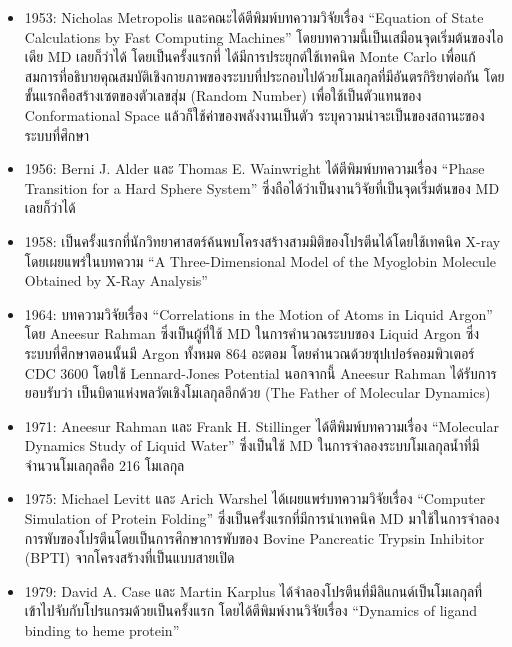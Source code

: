 \begin{itemize}
    \item 1953: Nicholas Metropolis และคณะได้ตีพิมพ์บทความวิจัยเรื่อง \enquote{Equation of State Calculations by Fast 
    Computing Machines}\autocite{metropolis1953} โดยบทความนี้เป็นเสมือนจุดเริ่มต้นของไอเดีย MD เลยก็ว่าได้ โดยเป็นครั้งแรกที่%
    ได้มีการประยุกต์ใช้เทคนิค Monte Carlo เพื่อแก้สมการที่อธิบายคุณสมบัติเชิงกายภาพของระบบที่ประกอบไปด้วยโมเลกุลที่มีอันตรกิริยาต่อกัน 
    โดยขั้นแรกคือสร้างเซตของตัวเลขสุ่ม (Random Number) เพื่อใช้เป็นตัวแทนของ Conformational Space แล้วก็ใช้ค่าของพลังงานเป็นตัว%
    ระบุความน่าจะเป็นของสถานะของระบบที่ศึกษา
    
    \item 1956: Berni J. Alder และ Thomas E. Wainwright ได้ตีพิมพ์บทความเรื่อง \enquote{Phase Transition for a Hard 
    Sphere System}\autocite{alder1957} ซึ่งถือได้ว่าเป็นงานวิจัยที่เป็นจุดเริ่มต้นของ MD เลยก็ว่าได้
    
    \item 1958: เป็นครั้งแรกที่นักวิทยาศาสตร์ค้นพบโครงสร้างสามมิติของโปรตีนได้โดยใช้เทคนิค X-ray โดยเผยแพร่ในบทความ 
    \enquote{A Three-Dimensional Model of the Myoglobin Molecule Obtained by X-Ray Analysis}\autocite{kendrew1958}

    \item 1964: บทความวิจัยเรื่อง \enquote{Correlations in the Motion of Atoms in Liquid Argon}\autocite{rahman1964} 
    โดย Aneesur Rahman ซึ่งเป็นผู้ที่ใช้ MD ในการคำนวณระบบของ Liquid Argon ซึ่งระบบที่ศึกษาตอนนั้นมี Argon ทั้งหมด 864 อะตอม 
    โดยคำนวณด้วยซุปเปอร์คอมพิวเตอร์  CDC 3600 โดยใช้ Lennard-Jones Potential นอกจากนี้ Aneesur Rahman ได้รับการยอบรับว่า%
    เป็นบิดาแห่งพลวัตเชิงโมเลกุลอีกด้วย (The Father of Molecular Dynamics)

    \item 1971: Aneesur Rahman และ Frank H. Stillinger ได้ตีพิมพ์บทความเรื่อง \enquote{Molecular Dynamics Study of 
    Liquid Water}\autocite{rahman1971} ซึ่งเป็นใช้ MD ในการจำลองระบบโมเลกุลน้ำที่มีจำนวนโมเลกุลคือ 216 โมเลกุล 

    \item 1975: Michael Levitt และ Arich Warshel ได้เผยแพร่บทความวิจัยเรื่อง \enquote{Computer Simulation of Protein 
    Folding}\autocite{levitt1975} ซึ่งเป็นครั้งแรกที่มีการนำเทคนิค MD มาใช้ในการจำลองการพับของโปรตีนโดยเป็นการศึกษาการพับของ 
    Bovine Pancreatic Trypsin Inhibitor (BPTI) จากโครงสร้างที่เป็นแบบสายเปิด

    \item 1979: David A. Case และ Martin Karplus ได้จำลองโปรตีนที่มีลิแกนด์เป็นโมเลกุลที่เข้าไปจับกับโปรแกรมด้วยเป็นครั้งแรก 
    โดยได้ตีพิมพ์งานวิจัยเรื่อง \enquote{Dynamics of ligand binding to heme protein}\autocite{case1979}


\end{itemize}
